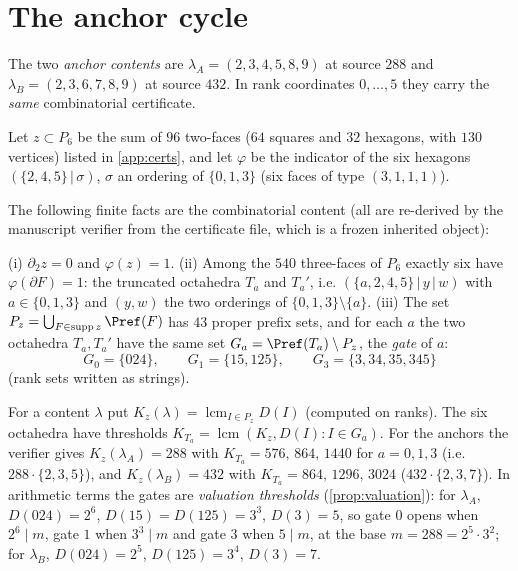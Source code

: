 \section{The anchor cycle}
The two \emph{anchor contents} are $\lambda_A=(2,3,4,5,8,9)$ at source $288$ and $\lambda_B=(2,3,6,7,8,9)$ at source $432$. In rank coordinates $0,\dots,5$ they carry the \emph{same} combinatorial certificate.
\begin{definition}\label{def:anchor}
Let $z\subset P_6$ be the sum of $96$ two-faces ($64$ squares and $32$ hexagons, with $130$ vertices) listed in \cref{app:certs}, and let $\varphi$ be the indicator of the six hexagons $(\{2,4,5\}\,|\,\sigma)$, $\sigma$ an ordering of $\{0,1,3\}$ (six faces of type $(3,1,1,1)$).
\end{definition}
The following finite facts are the combinatorial content (all are re-derived by the manuscript verifier from the certificate file, which is a frozen inherited object):
\begin{lemma}\label{lem:PS0}
(i) $\partial_2z=0$ and $\varphi(z)=1$. (ii) Among the $540$ three-faces of $P_6$ exactly six have $\varphi(\partial F)=1$: the truncated octahedra $T_a$ and $T_a'$, i.e. $(\{a,2,4,5\}\,|\,y\,|\,w)$ with $a\in\{0,1,3\}$ and $(y,w)$ the two orderings of $\{0,1,3\}\setminus\{a\}$. (iii) The set $P_z=\bigcup_{F\in\operatorname{supp}z}\Pref(F)$ has $43$ proper prefix sets, and for each $a$ the two octahedra $T_a,T_a'$ have the same set $G_a=\Pref(T_a)\setminus P_z$, the \emph{gate} of $a$:
\[
G_0=\{024\},\qquad G_1=\{15,125\},\qquad G_3=\{3,34,35,345\}
\]
(rank sets written as strings).
\end{lemma}
For a content $\lambda$ put $K_z(\lambda)=\operatorname{lcm}_{I\in P_z}D(I)$ (computed on ranks). The six octahedra have thresholds $K_{T_a}=\operatorname{lcm}(K_z,D(I):I\in G_a)$. For the anchors the verifier gives $K_z(\lambda_A)=288$ with $K_{T_a}=576,\,864,\,1440$ for $a=0,1,3$ (i.e. $288\cdot\{2,3,5\}$), and $K_z(\lambda_B)=432$ with $K_{T_a}=864,\,1296,\,3024$ ($432\cdot\{2,3,7\}$). In arithmetic terms the gates are \emph{valuation thresholds} (\cref{prop:valuation}): for $\lambda_A$, $D(024)=2^6$, $D(15)=D(125)=3^3$, $D(3)=5$, so gate $0$ opens when $2^6\mid m$, gate $1$ when $3^3\mid m$ and gate $3$ when $5\mid m$, at the base $m=288=2^5\cdot3^2$; for $\lambda_B$, $D(024)=2^5$, $D(125)=3^4$, $D(3)=7$.

